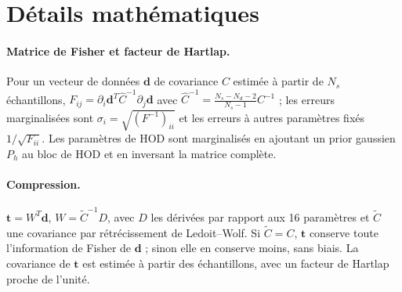 \documentclass[11pt,twocolumn]{article}
\begin{document}
\section{Détails mathématiques}
\label{app:maths}

\paragraph{Matrice de Fisher et facteur de Hartlap.} Pour un vecteur de données $\boldsymbol d$ de covariance $C$ estimée à partir de $N_s$ échantillons, $F_{ij} = \partial_i\boldsymbol d^T \hat C^{-1}\partial_j\boldsymbol d$ avec $\hat C^{-1} = \frac{N_s-N_d-2}{N_s-1}C^{-1}$ \cite{Hartlap2007} ; les erreurs marginalisées sont $\sigma_i=\sqrt{(F^{-1})_{ii}}$ et les erreurs à autres paramètres fixés $1/\sqrt{F_{ii}}$. Les paramètres de HOD sont marginalisés en ajoutant un prior gaussien $P_h$ au bloc de HOD et en inversant la matrice complète.

\paragraph{Compression.} $\boldsymbol t = W^T\boldsymbol d$, $W=\tilde C^{-1}D$, avec $D$ les dérivées par rapport aux 16 paramètres et $\tilde C$ une covariance par rétrécissement de Ledoit--Wolf. Si $\tilde C=C$, $\boldsymbol t$ conserve toute l'information de Fisher de $\boldsymbol d$ ; sinon elle en conserve moins, sans biais. La covariance de $\boldsymbol t$ est estimée à partir des échantillons, avec un facteur de Hartlap proche de l'unité.
\end{document}
